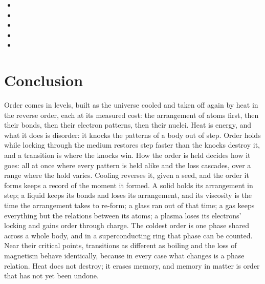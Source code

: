 \documentclass[11pt,a4paper]{article}
\begin{document}
\begin{itemize}
\item {}
\item {}
\item {}
\item {}
\item {}
\end{itemize}

\section*{Conclusion}

Order comes in levels, built as the universe cooled and taken off again by heat in the reverse order, each at its measured cost: the arrangement of atoms first, then their bonds, then their electron patterns, then their nuclei. Heat is energy, and what it does is disorder: it knocks the patterns of a body out of step. Order holds while locking through the medium restores step faster than the knocks destroy it, and a transition is where the knocks win. How the order is held decides how it goes: all at once where every pattern is held alike and the loss cascades, over a range where the hold varies. Cooling reverses it, given a seed, and the order it forms keeps a record of the moment it formed. A solid holds its arrangement in step; a liquid keeps its bonds and loses its arrangement, and its viscosity is the time the arrangement takes to re-form; a glass ran out of that time; a gas keeps everything but the relations between its atoms; a plasma loses its electrons' locking and gains order through charge. The coldest order is one phase shared across a whole body, and in a superconducting ring that phase can be counted. Near their critical points, transitions as different as boiling and the loss of magnetism behave identically, because in every case what changes is a phase relation. Heat does not destroy; it erases memory, and memory in matter is order that has not yet been undone.
\end{document}
